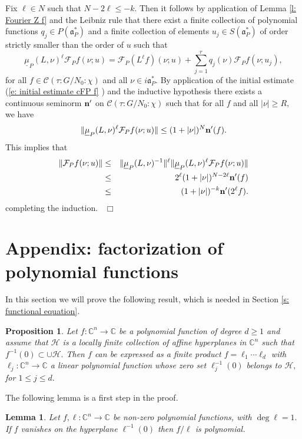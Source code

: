 \documentclass[12pt,a4paper]{article}
\newtheorem{Lemma}[Thm]{Lemma}
\newtheorem{Prop}[Thm]{Proposition}
\newenvironment{lemma}[0]{\begin{Lemma}\noindent}%
{\end{Lemma}}
\newenvironment{prop}[0]{\begin{Prop}\noindent}%
{\end{Prop}}
\def\qed{~\hfill\hbox{$\Box$}\medbreak}
\def\msy#1{{\mathbb #1}}
\def\C{{\msy C}}
\def\got#1{\mathfrak #1}
\def\fa{{\got a}}
\def\to{\rightarrow}
\def\cC{{\mathcal C}}
\def\cF{{\mathcal F}}
\def\cH{{\mathcal H}}
\numberwithin{Thm}{section}
\numberwithin{equation}{section}
\def\faPd{{\fa_P^*}}
\numberwithin{equation}{section}
\def\col{\!:\!}
\def\umu{\underline{\mu}}
\def\cchi{\chi}
\def\bfhyp{hyperplanes}
\begin{document}
Fix $\ell\in N$ such that $N - 2\ell \leq -  k.$ Then it follows by application of Lemma \ref{l: Fourier Z f} and the Leibniz rule that there exist a finite collection of polynomial functions $q_j \in P(\faPd)$ and 
a finite collection of elements $u_j \in S(\faPd)$ of order strictly smaller than 
the order of $u$ such that 
$$
\umu_P(L, \nu)^\ell \cF_P f(\nu; u) = \cF_P( L^\ell f)(\nu; u) 
+\sum_{j=1}^r q_j(\nu) \cF_P f(\nu; u_j) ,
$$%
for all $f \in \cC(\tau: G/N_0\col \cchi)$ and all $\nu \in i\faPd.$ 
By application of the initial estimate (\ref{e: initial estimate cFP f} ) and the inductive hypothesis there exists a continuous seminorm $\bf n'$ on $\cC(\tau: G/N_0\col \cchi)$ 
such that for all $f$ and all $|\nu|\geq R,$ we have
$$ 
\|\umu_P(L,\nu)^\ell \cF_Pf(\nu; u)\| \leq (1 + |\nu|)^N {\bf n'}(f).
$$%
This implies that
\begin{eqnarray*}
\|\cF_Pf(\nu; u)\| & \leq & \| \umu_P(L, \nu)^{-1}\|^\ell \|\umu_P(L,\nu)^\ell \cF_Pf(\nu; u)\| 
\\
&\leq & 2^\ell (1 + |\nu|)^{N-2\ell} {\bf n'} ( f)\\
&\leq & (1 + |\nu|)^{-k} {\bf n'} (2^\ell  f).
\end{eqnarray*} 
completing the induction.
\qed


\section{Appendix: factorization of polynomial functions}
In this section we will prove the following result, which is needed in Section \ref{s: functional equation}.
\begin{prop}
\label{p: factorization in first order}
Let $f: \C^n \to \C$ be a polynomial function of degree $d \geq 1$ and assume that $\cH$ is a locally finite
collection of affine {\bfhyp} in $\C^n$ such that $f^{-1}(0) \subset \cup \cH.$ Then $f$ can be expressed 
as a finite product $f =\ell_1 \cdots \ell_d$  with  $\ell_j: \C^n \to \C$ a
linear polynomial function whose zero set $\ell_j^{-1}(0)$ belongs to $\cH,$ for $1 \leq j \leq d.$ 
\end{prop}

The following lemma is a first step in the proof.

\begin{lemma}
\label{l: f is zero on hyperplane}
Let $f , \ell : \C^n \to \C$ be non-zero polynomial functions,  with $\deg \ell = 1.$ 
If $f$ vanishes on the hyperplane $\ell^{-1}(0)$ then $f/\ell$ is polynomial.
\end{lemma}
\end{document}
